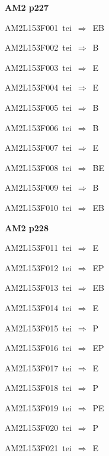 \par\vfill\eject
{\bf\hfill AM2 p227\hfill\hbox{}}\par\bigskip
{\sixrm AM2L153F001\ {\sixit tei}\ }$\Rightarrow$\ EB\par\smallskip
{\sixrm AM2L153F002\ {\sixit tei}\ }$\Rightarrow$\ B\par\smallskip
{\sixrm AM2L153F003\ {\sixit tei}\ }$\Rightarrow$\ E\par\smallskip
{\sixrm AM2L153F004\ {\sixit tei}\ }$\Rightarrow$\ E\par\smallskip
{\sixrm AM2L153F005\ {\sixit tei}\ }$\Rightarrow$\ B\par\smallskip
{\sixrm AM2L153F006\ {\sixit tei}\ }$\Rightarrow$\ B\par\smallskip
{\sixrm AM2L153F007\ {\sixit tei}\ }$\Rightarrow$\ E\par\smallskip
{\sixrm AM2L153F008\ {\sixit tei}\ }$\Rightarrow$\ BE\par\smallskip
{\sixrm AM2L153F009\ {\sixit tei}\ }$\Rightarrow$\ B\par\smallskip
{\sixrm AM2L153F010\ {\sixit tei}\ }$\Rightarrow$\ EB\par\smallskip

\par\vfill\eject
{\bf\hfill AM2 p228\hfill\hbox{}}\par\bigskip
{\sixrm AM2L153F011\ {\sixit tei}\ }$\Rightarrow$\ E\par\smallskip
{\sixrm AM2L153F012\ {\sixit tei}\ }$\Rightarrow$\ EP\par\smallskip
{\sixrm AM2L153F013\ {\sixit tei}\ }$\Rightarrow$\ EB\par\smallskip
{\sixrm AM2L153F014\ {\sixit tei}\ }$\Rightarrow$\ E\par\smallskip
{\sixrm AM2L153F015\ {\sixit tei}\ }$\Rightarrow$\ P\par\smallskip
{\sixrm AM2L153F016\ {\sixit tei}\ }$\Rightarrow$\ EP\par\smallskip
{\sixrm AM2L153F017\ {\sixit tei}\ }$\Rightarrow$\ E\par\smallskip
{\sixrm AM2L153F018\ {\sixit tei}\ }$\Rightarrow$\ P\par\smallskip
{\sixrm AM2L153F019\ {\sixit tei}\ }$\Rightarrow$\ PE\par\smallskip
{\sixrm AM2L153F020\ {\sixit tei}\ }$\Rightarrow$\ P\par\smallskip
{\sixrm AM2L153F021\ {\sixit tei}\ }$\Rightarrow$\ E\par\smallskip

